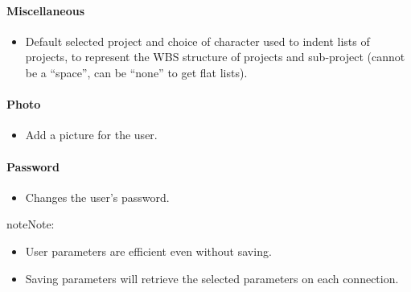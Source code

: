 \documentclass[letterpaper,10pt,english]{sphinxmanual}
\begin{document}
\paragraph{Miscellaneous}
\begin{itemize}
\item {} 
Default selected project and choice of character used to indent lists of projects, to represent the WBS structure of projects and sub-project (cannot be a “space”, can be “none” to get flat lists).

\end{itemize}
\paragraph{Photo}
\begin{itemize}
\item {} 
Add a picture for the user.

\end{itemize}
\paragraph{Password}
\begin{itemize}
\item {} 
Changes the user's password.

\end{itemize}

\begin{notice}{note}{Note:}\begin{itemize}
\item {} 
User parameters are efficient even without saving.

\item {} 
Saving parameters will retrieve the selected parameters on each connection.

\end{itemize}
\end{notice}
\end{document}
